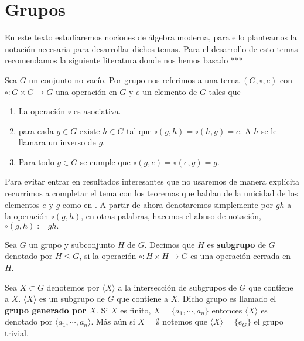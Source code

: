 \section*{Grupos}

En este texto estudiaremos nociones de álgebra moderna, para ello planteamos la notación necesaria para desarrollar dichos temas. Para el desarrollo de esto temas recomendamos la siguiente literatura donde nos hemos basado ***

	\begin{df}
Sea $G$ un conjunto no vacío. Por grupo nos referimos a una terna $(G, \circ, e)$ con $\circ:G \times G \to G$ una operación en $G$ y $e$ un elemento de $G$ tales que

	\begin{enumerate}
		\item La operación $\circ$ es asociativa.
		\item para cada $g \in G$ existe $h \in G$ tal que $ \circ (g,h)= \circ(h ,g)=e$. A $h$ se le llamara un inverso de $g$. 
		\item Para todo $g \in G$ se cumple que $\circ(g ,e) =  \circ(e,g) = g.$
	\end{enumerate}
	\end{df}

	\begin{cn}
Para evitar entrar en resultados interesantes que no usaremos de manera explícita recurrimos a completar el tema con los teoremas que hablan de la unicidad de los elementos $e$ y $g$ como en \cite{grove}. A partir de ahora denotaremos simplemente por $gh$ a la operación $\circ(g,h)$, en otras palabras, hacemos el abuso de notación,  $\circ(g,h):=gh.$
	\end{cn}
	
	\begin{df}
	Sea $G$ un grupo y subconjunto $H$ de $G$. Decimos que $H$ es \textbf{subgrupo} de $G$ denotado por $H \leq G$, si la operación $\circ:H \times H \to G$ es una operación cerrada en $H$.	
		\end{df}
		
\begin{ob}	
Sea $X \subset G$ denotemos por $\langle X \rangle$ a la intersección de subgrupos de $G$ que contiene a $X$. $\langle X \rangle$ es un subgrupo de $G$ que contiene a $X$. Dicho grupo es llamado el \textbf{grupo generado por $X$}. Si $X$ es finito, $X=\{ a_1, \cdots , a_n\}$ entonces $\langle X \rangle$ es denotado por $\langle a_1, \cdots, a_n \rangle$. Más aún si $X=\emptyset$ notemos que $\langle X \rangle=\{e_G\}$ el grupo trivial.
\end{ob}


